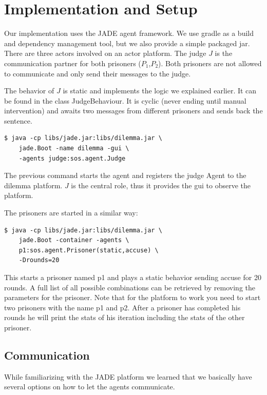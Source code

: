 \documentclass{acm_proc_article-sp}
\begin{document}
\section{Implementation and Setup}

Our implementation uses the JADE agent framework. We use gradle as a build and dependency management tool, but we also provide a simple packaged jar. There are three actors
involved on an actor platform. The judge $J$ is the communication partner for both
prisoners ($P_1$,$P_2$). Both prisoners are not allowed to communicate and only
send their messages to the judge.

The behavior of $J$ is static and implements the logic we explained earlier. It can be
found in the class JudgeBehaviour. It is cyclic (never ending until manual intervention) and awaits two messages from different prisoners and sends back the sentence.

\begin{lstlisting}
$ java -cp libs/jade.jar:libs/dilemma.jar \
    jade.Boot -name dilemma -gui \
    -agents judge:sos.agent.Judge
\end{lstlisting}

The previous command starts the agent and registers the judge Agent to the dilemma platform.
$J$ is the central role, thus it provides the gui to observe the platform.

The prisoners are started in a similar way:

\begin{lstlisting}
$ java -cp libs/jade.jar:libs/dilemma.jar \
    jade.Boot -container -agents \
    p1:sos.agent.Prisoner(static,accuse) \
    -Drounds=20
\end{lstlisting}

This starts a prisoner named p1 and plays a static behavior sending accuse for 20 rounds.
A full list of all possible combinations can be retrieved by removing the parameters for
the prisoner. Note that for the platform to work you need to start two prisoners
with the name p1 and p2. After a prisoner has completed his rounds he will print
the stats of his iteration including the stats of the other prisoner.

\subsection{Communication}

While familiarizing with the JADE platform we learned that we basically have several options
on how to let the agents communicate.
\end{document}
